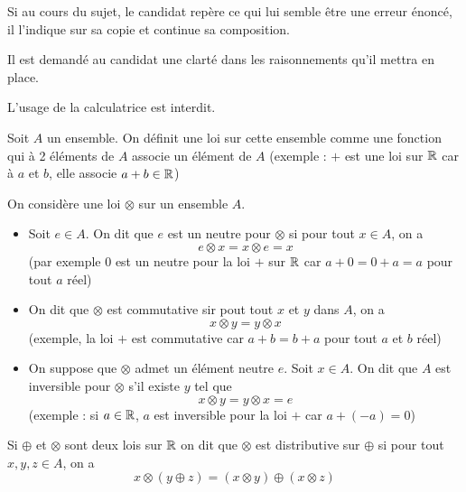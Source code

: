 

\usepackage{empheq}
\usepackage[c]{esvect}
\newcommand{\covec}[2]{\begin{pmatrix}#1 \\#2 \end{pmatrix}}




\flushleft
Si au cours du sujet, le candidat repère ce qui lui semble être une erreur énoncé, il l'indique sur sa copie et continue sa composition. \newline

Il est demandé au candidat une clarté dans les raisonnements qu'il mettra en place. \newline

L'usage de la calculatrice est interdit.\newline

Soit $A$ un ensemble. On définit une loi sur cette ensemble comme une fonction qui à 2 éléments de $A$ associe un élément de $A$ (exemple : $+$ est une loi sur $\mathbb{R}$ car à $a$ et $b$, elle associe $a+b\in\mathbb{R}$)\newline

On considère une loi $\otimes$ sur un ensemble $A$. 
\begin{itemize}
\item Soit $e\in A$. On dit que $e$ est un neutre pour $\otimes$ si pour tout $x\in A$, on a
$$e\otimes x = x \otimes e = x$$
(par exemple 0 est un neutre pour la loi $+$ sur $\mathbb{R}$ car $a+ 0 = 0+a = a$ pour tout $a$ réel)
\item On dit que $\otimes$ est commutative sir pout tout $x$ et $y$ dans $A$, on a 
$$x\otimes y = y\otimes x$$
(exemple, la loi $+$ est commutative car $a+b=b+a$ pour tout $a$ et $b$ réel)
\item On suppose que $\otimes$ admet un élément neutre $e$. Soit $x\in A$. On dit que $A$ est inversible pour $\otimes$ s'il existe $y$ tel que 
$$x\otimes y = y \otimes x = e$$
(exemple : si $a\in \mathbb{R}$, $a$ est inversible pour la loi $+$ car $a+ (-a) = 0$)
\end{itemize}
Si $\oplus$ et $\otimes$ sont deux lois sur $\mathbb{R}$ on dit que $\otimes$ est distributive sur $\oplus$ si pour tout $x,y,z\in A$, on a 
$$x\otimes(y\oplus z) = (x\otimes y) \oplus (x\otimes z)$$

